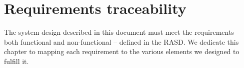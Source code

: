 \chapter{Requirements traceability} \label{ch:req}
\label{ch:req_traceability}
The system design described in this document must meet the requirements --
both functional and non-functional -- defined in the RASD. We dedicate this
chapter to mapping each requirement to the various elements we designed to
fulfill it.


